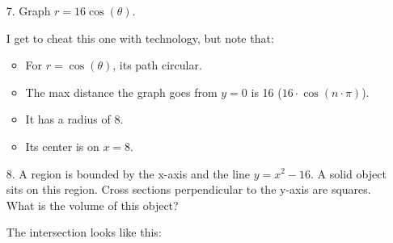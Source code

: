 \begin{itemize}
        \item [7.] Graph $r=16\cos(\theta)$.
        \\
        \begin{mdframed}
                I get to cheat this one with technology, but note that:
                \begin{itemize}
                    \item For $r=\cos(\theta)$, its path circular.
                    \item The max distance the graph goes from $y=0$ is 16 ($16\cdot\cos(n\cdot\pi)$).
                    \item It has a radius of 8.
                    \item Its center is on $x=8$.
                \end{itemize}
                \begin{center}
                \end{center}
        \end{mdframed}

        \item [8.] A region is bounded by the x-axis and the line $y=x^{2}-16$. A solid object sits on this region. Cross sections perpendicular to the y-axis are squares. What is the volume of this object?
        \\
        \begin{mdframed}
            The intersection looks like this:
            \begin{center}
\end{center}
\end{mdframed}
\end{itemize}
